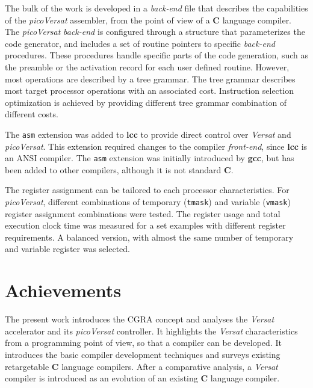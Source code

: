 The bulk of the work is developed in a {\it back-end} file that describes
the capabilities of the {\it picoVersat} assembler, from the point of view of
a {\bf C} language compiler.
The {\it picoVersat} {\it back-end} is configured through a structure that
parameterizes the code generator, and includes a set of routine pointers to
specific {\it back-end} procedures.
These procedures handle specific parts of the code generation, such as the
preamble or the activation record for each user defined routine.
However, most operations are described by a tree grammar.
The tree grammar describes most target processor operations with an associated
cost. Instruction selection optimization is achieved by providing different
tree grammar combination of different costs.

The {\tt asm} extension was added to {\bf lcc} to provide direct control
over {\it Versat} and {\it picoVersat}.
This extension required changes to the compiler {\it front-end}, since
{\bf lcc} is an {\sc ANSI} compiler.
The {\tt asm} extension was initially introduced by {\bf gcc}, but has
been added to other compilers, although it is not standard {\bf C}.

The register assignment can be tailored to each processor characteristics.
For {\it picoVersat}, different combinations of temporary ({\tt tmask})
and variable ({\tt vmask}) register assignment combinations were tested.
The register usage and total execution clock time was measured for a set
examples with different register requirements.
A balanced version, with almost the same number of temporary and variable
register was selected.


\section{Achievements}
\label{section:achievements}

The present work introduces the {\sc CGRA} concept and analyses the {\it Versat}
accelerator and its {\it picoVersat} controller.  It highlights the {\it Versat}
characteristics from a programming point of view, so that a compiler can be
developed.  It introduces the basic compiler development techniques and surveys
existing retargetable {\bf C} language compilers.  After a comparative analysis,
a {\it Versat} compiler is introduced as an evolution of an existing {\bf C}
language compiler.

